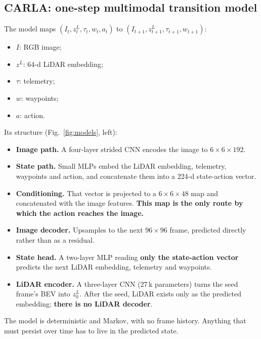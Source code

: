 \documentclass[11pt]{article}
\begin{document}
\subsection{CARLA: one-step multimodal transition model}
\label{sec:carla-model}

The model maps $(I_t, z^{L}_t, \tau_t, w_t, a_t)$ to $(I_{t+1}, z^{L}_{t+1}, \tau_{t+1}, w_{t+1})$:
\begin{itemize}
  \item $I$: RGB image;
  \item $z^{L}$: 64-d LiDAR embedding;
  \item $\tau$: telemetry;
  \item $w$: waypoints;
  \item $a$: action.
\end{itemize}

Its structure (Fig.~\ref{fig:models}, left):
\begin{itemize}
  \item \textbf{Image path.} A four-layer strided CNN encodes the image to $6\times6\times192$.
  \item \textbf{State path.} Small MLPs embed the LiDAR embedding, telemetry, waypoints and action, and concatenate them into a 224-d state-action vector.
  \item \textbf{Conditioning.} That vector is projected to a $6\times6\times48$ map and concatenated with the image features. \textbf{This map is the only route by which the action reaches the image.}
  \item \textbf{Image decoder.} Upsamples to the next $96\times96$ frame, predicted directly rather than as a residual.
  \item \textbf{State head.} A two-layer MLP reading \textbf{only the state-action vector} predicts the next LiDAR embedding, telemetry and waypoints.
  \item \textbf{LiDAR encoder.} A three-layer CNN (27\,k parameters) turns the seed frame's BEV into $z^L_0$. After the seed, LiDAR exists only as the predicted embedding; \textbf{there is no LiDAR decoder}.
\end{itemize}
The model is deterministic and Markov, with no frame history. Anything that must persist over time has to live in the predicted state.
\end{document}
